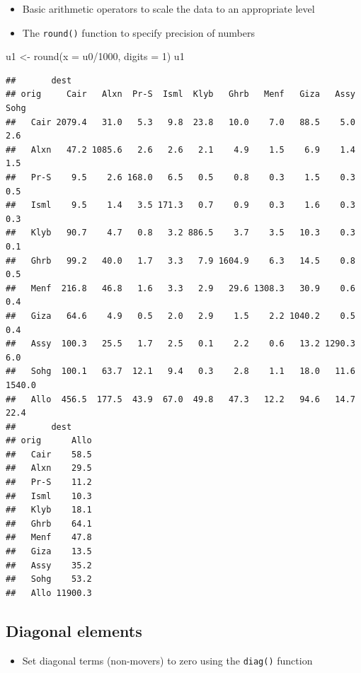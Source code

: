 \documentclass[
]{book}
\newenvironment{Shaded}{\begin{snugshade}}{\end{snugshade}}
\newcommand{\AttributeTok}[1]{\textcolor[rgb]{0.77,0.63,0.00}{#1}}
\newcommand{\DecValTok}[1]{\textcolor[rgb]{0.00,0.00,0.81}{#1}}
\newcommand{\FunctionTok}[1]{\textcolor[rgb]{0.00,0.00,0.00}{#1}}
\newcommand{\NormalTok}[1]{#1}
\newcommand{\OtherTok}[1]{\textcolor[rgb]{0.56,0.35,0.01}{#1}}
\newcommand{\SpecialCharTok}[1]{\textcolor[rgb]{0.00,0.00,0.00}{#1}}
\providecommand{\tightlist}{%
  \setlength{\itemsep}{0pt}\setlength{\parskip}{0pt}}
\begin{document}
\begin{itemize}
\tightlist
\item
  Basic arithmetic operators to scale the data to an appropriate level
\item
  The \texttt{round()} function to specify precision of numbers
\end{itemize}

\begin{Shaded}
\begin{Highlighting}[]
\NormalTok{u1 }\OtherTok{\textless{}{-}} \FunctionTok{round}\NormalTok{(}\AttributeTok{x =}\NormalTok{ u0}\SpecialCharTok{/}\DecValTok{1000}\NormalTok{, }\AttributeTok{digits =} \DecValTok{1}\NormalTok{)}
\NormalTok{u1}
\end{Highlighting}
\end{Shaded}

\begin{verbatim}
##       dest
## orig     Cair   Alxn  Pr-S  Isml  Klyb   Ghrb   Menf   Giza   Assy   Sohg
##   Cair 2079.4   31.0   5.3   9.8  23.8   10.0    7.0   88.5    5.0    2.6
##   Alxn   47.2 1085.6   2.6   2.6   2.1    4.9    1.5    6.9    1.4    1.5
##   Pr-S    9.5    2.6 168.0   6.5   0.5    0.8    0.3    1.5    0.3    0.5
##   Isml    9.5    1.4   3.5 171.3   0.7    0.9    0.3    1.6    0.3    0.3
##   Klyb   90.7    4.7   0.8   3.2 886.5    3.7    3.5   10.3    0.3    0.1
##   Ghrb   99.2   40.0   1.7   3.3   7.9 1604.9    6.3   14.5    0.8    0.5
##   Menf  216.8   46.8   1.6   3.3   2.9   29.6 1308.3   30.9    0.6    0.4
##   Giza   64.6    4.9   0.5   2.0   2.9    1.5    2.2 1040.2    0.5    0.4
##   Assy  100.3   25.5   1.7   2.5   0.1    2.2    0.6   13.2 1290.3    6.0
##   Sohg  100.1   63.7  12.1   9.4   0.3    2.8    1.1   18.0   11.6 1540.0
##   Allo  456.5  177.5  43.9  67.0  49.8   47.3   12.2   94.6   14.7   22.4
##       dest
## orig      Allo
##   Cair    58.5
##   Alxn    29.5
##   Pr-S    11.2
##   Isml    10.3
##   Klyb    18.1
##   Ghrb    64.1
##   Menf    47.8
##   Giza    13.5
##   Assy    35.2
##   Sohg    53.2
##   Allo 11900.3
\end{verbatim}

\hypertarget{diagonal-elements}{%
\subsection{Diagonal elements}\label{diagonal-elements}}

\begin{itemize}
\tightlist
\item
  Set diagonal terms (non-movers) to zero using the \texttt{diag()} function
\end{itemize}
\end{document}
